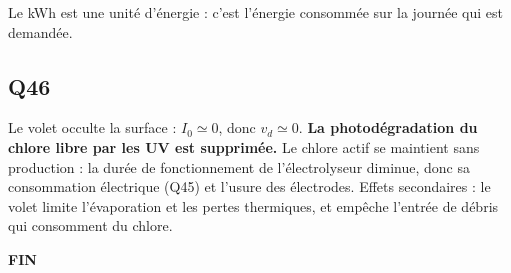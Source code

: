 \documentclass[11pt,a4paper]{article}
\newcommand{\equationajustee}[1]{%
  \sbox{\boiteequation}{$\displaystyle #1$}%
  \ifdim\wd\boiteequation>\linewidth
    \[\resizebox{\linewidth}{!}{\usebox{\boiteequation}}\]%
  \else
    \[#1\]%
  \fi}
\begin{document}
\equationajustee{\boxed{W\simeq0{,}35\ \text{kWh}}}

Le kWh est une unité d'énergie : c'est l'énergie consommée sur la journée qui est demandée.

\hypertarget{q46}{%
\subsection{Q46}\label{q46}}

Le volet occulte la surface : \(I_0\simeq0\), donc \(v_d\simeq0\). \textbf{La photodégradation du chlore libre par les UV est supprimée.} Le chlore actif se maintient sans production : la durée de fonctionnement de l'électrolyseur diminue, donc sa consommation électrique (Q45) et l'usure des électrodes. Effets secondaires : le volet limite l'évaporation et les pertes thermiques, et empêche l'entrée de débris qui consomment du chlore.

\textbf{FIN}
\end{document}
